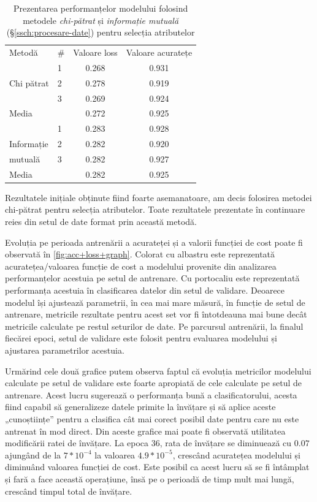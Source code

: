 \begin{table}[h]
\centering
\caption{Prezentarea performanțelor modelului folosind metodele \textit{chi-pătrat} și \textit{informație mutuală} (\S\ref{ssch:procesare-date}) pentru selecția atributelor}
\label{tabel:acc+loss+comparison}
\renewcommand{\arraystretch}{1.2}
\begin{tabular}{@{}llcc@{}}
\rowcolor{gray!50} Metodă & \# & Valoare loss & Valoare acuratețe \\ 
& 1 & 0.268 & 0.931 \\
Chi pătrat & 2 & 0.278 & 0.919 \\
& 3 & 0.269 & 0.924 \\
\rowcolor{gray!15} Media & & 0.272 & 0.925 \\
& 1 & 0.283 & 0.928 \\{}
Informație & 2 & 0.282 & 0.920 \\
mutuală & 3 & 0.282 & 0.927 \\
\rowcolor{gray!15} Media & & 0.282 & 0.925 \\
\end{tabular}
\end{table}

Rezultatele inițiale obținute fiind foarte asemanatoare, am decis folosirea metodei chi-pătrat pentru selecția atributelor. Toate rezultatele prezentate în continuare reies din setul de date format prin această metodă.

Evoluția pe perioada antrenării a acurateței și a valorii funcției de cost poate fi observată în \autoref{fig:acc+loss+graph}. Colorat cu albastru este reprezentată acuratețea/valoarea funcție de cost a modelului provenite din analizarea performanțelor acestuia pe setul de antrenare. Cu portocaliu este reprezentată performanța acestuia în clasificarea datelor din setul de validare. Deoarece modelul își ajustează parametrii, în cea mai mare măsură, în funcție de setul de antrenare, metricile rezultate pentru acest set vor fi întotdeauna mai bune decât metricile calculate pe restul seturilor de date. Pe parcursul antrenării, la finalul fiecărei epoci, setul de validare este folosit pentru evaluarea modelului și ajustarea parametrilor acestuia. 

Urmărind cele două grafice putem observa faptul că evoluția metricilor modelului calculate pe setul de validare este foarte apropiată de cele calculate pe setul de antrenare. Acest lucru sugerează o performanța bună a clasificatorului, acesta fiind capabil să generalizeze datele primite la învățare și să aplice aceste „cunoștiințe” pentru a clasifica cât mai corect posibil date pentru care nu este antrenat în mod direct. Din aceste grafice mai poate fi observată utilitatea modificării ratei de învățare. La epoca 36, rata de învățare se diminuează cu $0.07$ ajungând de la $7*10^{-4}$ la valoarea $4.9*10^{-5}$, crescând acuratețea modelului și diminuând valoarea funcției de cost. Este posibil ca acest lucru să se fi întâmplat și fară a face această operațiune, însă pe o perioadă de timp mult mai lungă, crescând timpul total de învățare.


